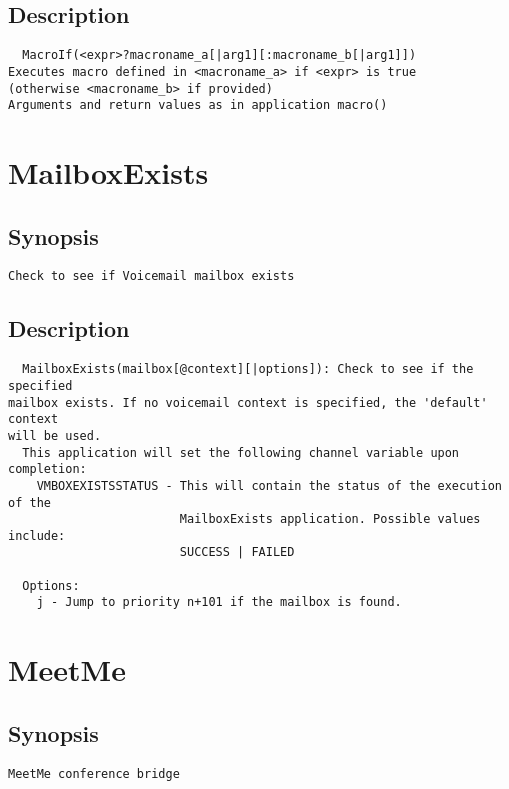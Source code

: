 \subsection{Description}
\begin{verbatim}
  MacroIf(<expr>?macroname_a[|arg1][:macroname_b[|arg1]])
Executes macro defined in <macroname_a> if <expr> is true
(otherwise <macroname_b> if provided)
Arguments and return values as in application macro()

\end{verbatim}


\section{MailboxExists}
\subsection{Synopsis}
\begin{verbatim}
Check to see if Voicemail mailbox exists
\end{verbatim}
\subsection{Description}
\begin{verbatim}
  MailboxExists(mailbox[@context][|options]): Check to see if the specified
mailbox exists. If no voicemail context is specified, the 'default' context
will be used.
  This application will set the following channel variable upon completion:
    VMBOXEXISTSSTATUS - This will contain the status of the execution of the
                        MailboxExists application. Possible values include:
                        SUCCESS | FAILED

  Options:
    j - Jump to priority n+101 if the mailbox is found.

\end{verbatim}


\section{MeetMe}
\subsection{Synopsis}
\begin{verbatim}
MeetMe conference bridge
\end{verbatim}
